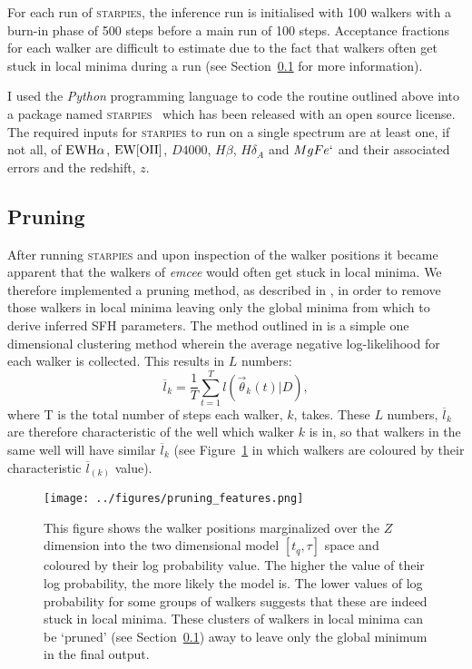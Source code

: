 \documentclass[useAMS,usenatbib]{mn2e}
\begin{document}
For each run of \textsc{starpies}, the inference run is initialised with 100 walkers with a burn-in phase of 500 steps before a main run of 100 steps. Acceptance fractions for each walker are difficult to estimate due to the fact that walkers often get stuck in local minima during a run (see Section~\ref{sec:pruning} for more information). 

I used the \emph{Python} programming language to code the routine outlined above into a package named \textsc{starpies} ~which has been released with an open source license. The required inputs for \textsc{starpies} to run on a single spectrum are at least one, if not all, of $\rm{EW}H\alpha$, $\rm{EW}[OII]$, $D4000$, $H\beta$, $H\delta_A$ and $MgFe`$ and their associated errors and the redshift, $z$. 


\subsection{Pruning}\label{sec:pruning}

After running \textsc{starpies} and upon inspection of the walker positions it became apparent that the walkers of \emph{emcee} would often get stuck in local minima. We therefore implemented a pruning method, as described in \cite{hou12}, in order to remove those walkers in local minima leaving only the global minima from which to derive inferred SFH parameters. The method outlined in \cite{hou12} is a simple one dimensional clustering method wherein the average negative log-likelihood for each walker is collected. This results in $L$ numbers:
\begin{equation}
\overline{l}_k = \frac{1}{T} \sum^{T}_{t=1} l(\vec{\theta}_k(t)|D),
\end{equation}
where T is the total number of steps each walker, $k$, takes. These $L$ numbers, $\overline{l}_k$ are therefore characteristic of the well which walker $k$ is in, so that walkers in the same well will have similar $\overline{l}_k$ (see Figure~\ref{fig:localminima} in which walkers are coloured by their characteristic $\overline{l}_{(k)}$ value). 


\begin{figure}
\centering
\texttt{[image: ../figures/pruning\_features.png]}
\caption{This figure shows the walker positions marginalized over the $Z$ dimension into the two dimensional model $[t_q, \tau]$ space and coloured by their log probability value. The higher the value of their log probability, the more likely the model is. The lower values of log probability for some groups of walkers suggests that these are indeed stuck in local minima. These clusters of walkers in local minima can be `pruned' (see Section~\ref{sec:pruning}) away to leave only the global minimum in the final output.}
\label{fig:localminima}
\end{figure}
\end{document}
